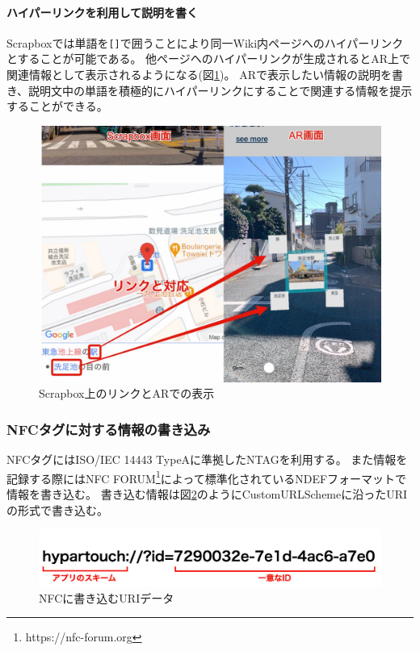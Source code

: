 \paragraph*{ハイパーリンクを利用して説明を書く}
Scrapboxでは単語を\texttt{[]}で囲うことにより同一Wiki内ページへのハイパーリンクとすることが可能である。
他ページヘのハイパーリンクが生成されるとAR上で関連情報として表示されるようになる(図\ref{fig:scrapbox_link_and_ar})。
ARで表示したい情報の説明を書き、説明文中の単語を積極的にハイパーリンクにすることで関連する情報を提示することができる。

\begin{figure}[h]
  \centering
  \includegraphics[width=120mm]{images/scrapbox_link_and_ar.jpg}
  \caption{Scrapbox上のリンクとARでの表示} \label{fig:scrapbox_link_and_ar}
\end{figure}

\subsubsection{NFCタグに対する情報の書き込み}
NFCタグにはISO/IEC 14443 TypeAに準拠したNTAGを利用する。
また情報を記録する際にはNFC FORUM\footnote{\textsf{https://nfc-forum.org}}によって標準化されているNDEFフォーマットで情報を書き込む。
書き込む情報は図\ref{fig:nfc_uri}のようにCustomURLSchemeに沿ったURIの形式で書き込む。

\begin{figure}[h]
  \centering
  \includegraphics[width=120mm]{images/nfc_uri.png}
  \caption{NFCに書き込むURIデータ} \label{fig:nfc_uri}
\end{figure}

